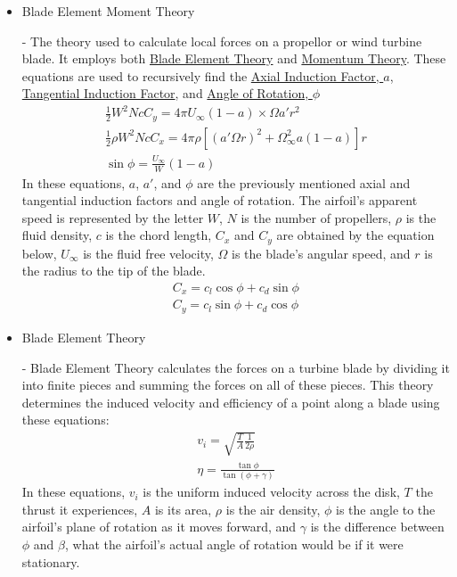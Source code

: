 \documentclass{article}
\begin{document}
\begin{itemize}
	\item \hypertarget{BEM}{Blade Element Moment Theory} - The theory used to calculate local forces on a propellor or wind turbine blade. It employs both \hyperlink{BET}{Blade Element Theory} and \hyperlink{MT}{Momentum Theory}. These equations are used to recursively find the \hyperlink{a}{Axial Induction Factor, $a$}, \hyperlink{a'}{Tangential Induction Factor}, and \hyperlink{phi}{Angle of Rotation, $\phi$}
	\begin{equation}
	\begin{aligned}
		\frac{1}{2} W^{2} N c C_{y} = 4 \pi U_{\infty} (1 - a) \times \Omega a' r^{2} \\
		\frac{1}{2} \rho W^{2} N c C_{x} = 4 \pi \rho [(a' \Omega r)^{2} + \Omega^{2}_{\infty} a (1 - a)] r \\
		\sin \phi = \frac{U_{\infty}}{W} (1 - a)
	\end{aligned}
	\end{equation}
In these equations, $a$, $a'$, and $\phi$ are the previously mentioned axial and tangential induction factors and angle of rotation. The airfoil's apparent speed is represented by the letter $W$, $N$ is the number of propellers, $\rho$ is the fluid density, $c$ is the chord length, $C_{x}$ and $C_{y}$ are obtained by the equation below, $U_{\infty}$ is the fluid free velocity, $\Omega$ is the blade's angular speed, and $r$ is the radius to the tip of the blade.
	\begin{equation}
	\begin{aligned}
		C_{x} = c_{l} \cos{\phi} + c_{d} \sin{\phi} \\
		C_{y} = c_{l} \sin{\phi} + c_{d} \cos{\phi}
	\end{aligned}
	\end{equation}
	
	\item \hypertarget{BET}{Blade Element Theory} - Blade Element Theory calculates the forces on a turbine blade by dividing it into finite pieces and summing the forces on all of these pieces. This theory determines the induced velocity and efficiency of a point along a blade using these equations:
	\begin{equation}
	\begin{aligned}
		v_{i} = \sqrt{\frac{T}{A} \frac{1}{2 \rho}} \\
        		\eta = \frac{\tan{\phi}}{\tan{(\phi + \gamma)}}
	\end{aligned}
	\end{equation}
In these equations, $v_{i}$ is the uniform induced velocity across the disk, $T$ the thrust it experiences, $A$ is its area, $\rho$ is the air density, $\phi$ is the angle to the airfoil's plane of rotation as it moves forward, and $\gamma$ is the difference between $\phi$ and $\beta$, what the airfoil's actual angle of rotation would be if it were stationary.


\end{itemize}
\end{document}
